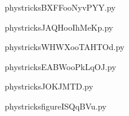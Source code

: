     \newcommand{\CaptionFigBXFFooNyvPYY}{<+Type your caption here+>}
    \begin{center}
        
    \end{center}
    phystricksBXFFooNyvPYY.py

    

    \clearpage
    


    \newcommand{\CaptionFigJAQHooIhMeKp}{<+Type your caption here+>}
    \begin{center}
        
    \end{center}
    phystricksJAQHooIhMeKp.py

    

    \clearpage
    


    \newcommand{\CaptionFigWHWXooTAHTOd}{<+Type your caption here+>}
    \begin{center}
        
    \end{center}
    phystricksWHWXooTAHTOd.py

    

    \clearpage
    


    \newcommand{\CaptionFigEABWooPkLqOJ}{<+Type your caption here+>}
    \begin{center}
        
    \end{center}
    phystricksEABWooPkLqOJ.py

    

    \clearpage
    


    \newcommand{\CaptionFigJOKJMTD}{<+Type your caption here+>}
    \begin{center}
        
    \end{center}
    phystricksJOKJMTD.py

    

    \clearpage
    


    \newcommand{\CaptionFigfigureISQqBVu}{<+Type your caption here+>}
    \begin{center}
        
    \end{center}
    phystricksfigureISQqBVu.py

